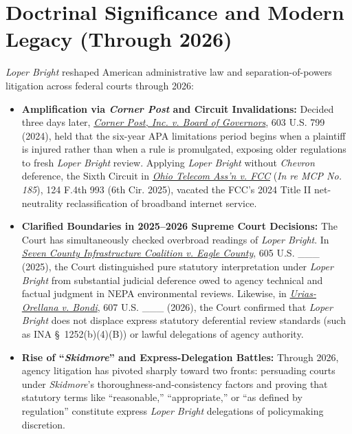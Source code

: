 \documentclass[12pt]{article}
\begin{document}
\section{Doctrinal Significance and Modern Legacy (Through 2026)}

\textit{Loper Bright} reshaped American administrative law and separation-of-powers litigation across federal courts through 2026:

\begin{itemize}
  \item \textbf{Amplification via \textit{Corner Post} and Circuit Invalidations:} Decided three days later, \href{https://www.supremecourt.gov/opinions/23pdf/22-1008_1b82.pdf}{\textit{Corner Post, Inc. v. Board of Governors}}, 603 U.S. 799 (2024), held that the six-year APA limitations period begins when a plaintiff is injured rather than when a rule is promulgated, exposing older regulations to fresh \textit{Loper Bright} review. Applying \textit{Loper Bright} without \textit{Chevron} deference, the Sixth Circuit in \href{https://www.law.cornell.edu/wex/net_neutrality}{\textit{Ohio Telecom Ass'n v. FCC}} (\textit{In re MCP No. 185}), 124 F.4th 993 (6th Cir. 2025), vacated the FCC's 2024 Title II net-neutrality reclassification of broadband internet service.
  \item \textbf{Clarified Boundaries in 2025--2026 Supreme Court Decisions:} The Court has simultaneously checked overbroad readings of \textit{Loper Bright}. In \href{https://www.supremecourt.gov/opinions/24pdf/23-975_m648.pdf}{\textit{Seven County Infrastructure Coalition v. Eagle County}}, 605 U.S. \_\_\_ (2025), the Court distinguished pure statutory interpretation under \textit{Loper Bright} from substantial judicial deference owed to agency technical and factual judgment in NEPA environmental reviews. Likewise, in \href{https://supreme.justia.com/cases/federal/us/607/24-777/}{\textit{Urias-Orellana v. Bondi}}, 607 U.S. \_\_\_ (2026), the Court confirmed that \textit{Loper Bright} does not displace express statutory deferential review standards (such as INA \S~1252(b)(4)(B)) or lawful delegations of agency authority.
  \item \textbf{Rise of ``\textit{Skidmore}'' and Express-Delegation Battles:} Through 2026, agency litigation has pivoted sharply toward two fronts: persuading courts under \textit{Skidmore}'s thoroughness-and-consistency factors and proving that statutory terms like ``reasonable,'' ``appropriate,'' or ``as defined by regulation'' constitute express \textit{Loper Bright} delegations of policymaking discretion.
\end{itemize}
\end{document}
